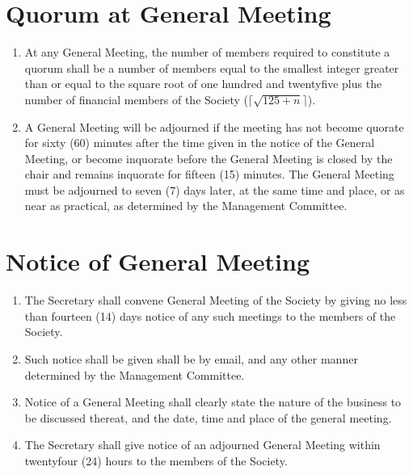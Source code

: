 \documentclass[a4paper]{article}
\newcommand*{\sectionr}[1]{{\raggedright \section{#1}}}
\begin{document}
\sectionr{Quorum at General Meeting}
\begin{enumerate}
\item At any General Meeting, the number of members required to constitute a quorum shall be a number of members equal to the smallest integer greater than or equal to the square root of one hundred and twenty\textendash five plus the number of financial members of the Society ($\Big\lceil\sqrt{125+n}\Big\rceil$).
\item A General Meeting will be adjourned if the meeting has not become quorate for sixty (60) minutes after the time given in the notice of the General Meeting, or become inquorate before the General Meeting is closed by the chair and remains inquorate for fifteen (15) minutes. The General Meeting must be adjourned to seven (7) days later, at the same time and place, or as near as practical, as determined by the Management Committee.
\end{enumerate}

\sectionr{Notice of General Meeting}
\begin{enumerate}
\item The Secretary shall convene General Meeting of the Society by giving no less than fourteen (14) days notice of any such meetings to the members of the Society.
\item Such notice shall be given shall be by e\textendash mail, and any other manner determined by the Management Committee.
\item Notice of a General Meeting shall clearly state the nature of the business to be discussed thereat, and the date, time and place of the general meeting.
\item  The Secretary shall give notice of an adjourned General Meeting within twenty\textendash four (24) hours to the members of the Society.
\end{enumerate}
\end{document}
